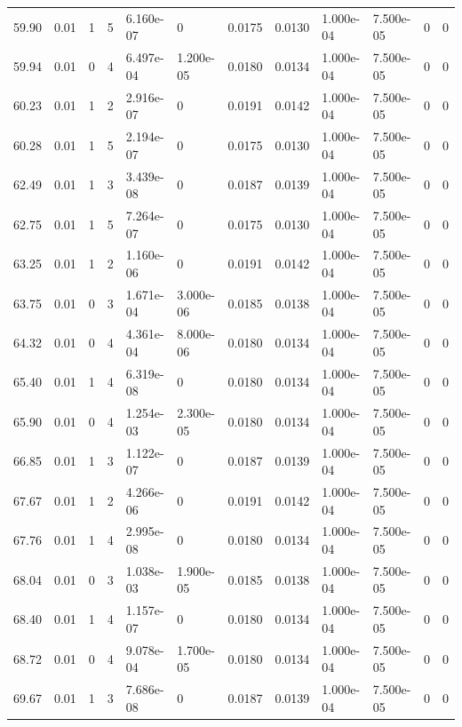 \documentclass[preview]{standalone}
\begin{document}
{{{{\begin{tabular}{L{1.2cm}C{1.2cm} C{0.3cm}C{0.5cm} C{1.4cm}C{1.4cm} C{1.4cm}C{1.4cm} C{1.6cm}C{1.6cm} C{1.6cm}C{1.6cm}}
  59.90  &  0.01  & 1     &  5 &  6.160e-07  & 0  &  0.0175&   0.0130& 1.000e-04 & 7.500e-05   &  0 & 0  \\ 
  59.94  &  0.01  & 0     &  4 &  6.497e-04  & 1.200e-05  &  0.0180&   0.0134& 1.000e-04 & 7.500e-05   &  0 & 0  \\ 
  60.23  &  0.01  & 1     &  2 &  2.916e-07  & 0  &  0.0191&   0.0142& 1.000e-04 & 7.500e-05   &  0 & 0  \\ 
  60.28  &  0.01  & 1     &  5 &  2.194e-07  & 0  &  0.0175&   0.0130& 1.000e-04 & 7.500e-05   &  0 & 0  \\ 
  62.49  &  0.01  & 1     &  3 &  3.439e-08  & 0  &  0.0187&   0.0139& 1.000e-04 & 7.500e-05   &  0 & 0  \\ 
  62.75  &  0.01  & 1     &  5 &  7.264e-07  & 0  &  0.0175&   0.0130& 1.000e-04 & 7.500e-05   &  0 & 0  \\ 
  63.25  &  0.01  & 1     &  2 &  1.160e-06  & 0  &  0.0191&   0.0142& 1.000e-04 & 7.500e-05   &  0 & 0  \\ 
  63.75  &  0.01  & 0     &  3 &  1.671e-04  & 3.000e-06  &  0.0185&   0.0138& 1.000e-04 & 7.500e-05   &  0 & 0  \\ 
  64.32  &  0.01  & 0     &  4 &  4.361e-04  & 8.000e-06  &  0.0180&   0.0134& 1.000e-04 & 7.500e-05   &  0 & 0  \\ 
  65.40  &  0.01  & 1     &  4 &  6.319e-08  & 0  &  0.0180&   0.0134& 1.000e-04 & 7.500e-05   &  0 & 0  \\ 
  65.90  &  0.01  & 0     &  4 &  1.254e-03  & 2.300e-05  &  0.0180&   0.0134& 1.000e-04 & 7.500e-05   &  0 & 0  \\ 
  66.85  &  0.01  & 1     &  3 &  1.122e-07  & 0  &  0.0187&   0.0139& 1.000e-04 & 7.500e-05   &  0 & 0  \\ 
  67.67  &  0.01  & 1     &  2 &  4.266e-06  & 0  &  0.0191&   0.0142& 1.000e-04 & 7.500e-05   &  0 & 0  \\ 
  67.76  &  0.01  & 1     &  4 &  2.995e-08  & 0  &  0.0180&   0.0134& 1.000e-04 & 7.500e-05   &  0 & 0  \\ 
  68.04  &  0.01  & 0     &  3 &  1.038e-03  & 1.900e-05  &  0.0185&   0.0138& 1.000e-04 & 7.500e-05   &  0 & 0  \\ 
  68.40  &  0.01  & 1     &  4 &  1.157e-07  & 0  &  0.0180&   0.0134& 1.000e-04 & 7.500e-05   &  0 & 0  \\ 
  68.72  &  0.01  & 0     &  4 &  9.078e-04  & 1.700e-05  &  0.0180&   0.0134& 1.000e-04 & 7.500e-05   &  0 & 0  \\ 
  69.67  &  0.01  & 1     &  3 &  7.686e-08  & 0  &  0.0187&   0.0139& 1.000e-04 & 7.500e-05   &  0 & 0  \\ 

\end{tabular}}}}}
\end{document}
